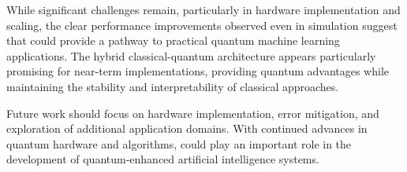 While significant challenges remain, particularly in hardware implementation and scaling, the clear performance improvements observed even in simulation suggest that \qmann could provide a pathway to practical quantum machine learning applications. The hybrid classical-quantum architecture appears particularly promising for near-term implementations, providing quantum advantages while maintaining the stability and interpretability of classical approaches.

Future work should focus on hardware implementation, error mitigation, and exploration of additional application domains. With continued advances in quantum hardware and algorithms, \qmann could play an important role in the development of quantum-enhanced artificial intelligence systems.
